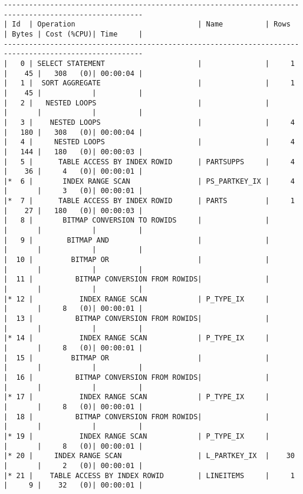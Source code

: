\documentclass[10pt]{article}
\begin{document}
\begin{lstlisting}[style=queryexecutionplan]
-------------------------------------------------------------------------------------------------------
| Id  | Operation                             | Name          | Rows  | Bytes | Cost (%CPU)| Time     |
-------------------------------------------------------------------------------------------------------
|   0 | SELECT STATEMENT                      |               |     1 |    45 |   308   (0)| 00:00:04 |
|   1 |  SORT AGGREGATE                       |               |     1 |    45 |            |          |
|   2 |   NESTED LOOPS                        |               |       |       |            |          |
|   3 |    NESTED LOOPS                       |               |     4 |   180 |   308   (0)| 00:00:04 |
|   4 |     NESTED LOOPS                      |               |     4 |   144 |   180   (0)| 00:00:03 |
|   5 |      TABLE ACCESS BY INDEX ROWID      | PARTSUPPS     |     4 |    36 |     4   (0)| 00:00:01 |
|*  6 |       INDEX RANGE SCAN                | PS_PARTKEY_IX |     4 |       |     3   (0)| 00:00:01 |
|*  7 |      TABLE ACCESS BY INDEX ROWID      | PARTS         |     1 |    27 |   180   (0)| 00:00:03 |
|   8 |       BITMAP CONVERSION TO ROWIDS     |               |       |       |            |          |
|   9 |        BITMAP AND                     |               |       |       |            |          |
|  10 |         BITMAP OR                     |               |       |       |            |          |
|  11 |          BITMAP CONVERSION FROM ROWIDS|               |       |       |            |          |
|* 12 |           INDEX RANGE SCAN            | P_TYPE_IX     |       |       |     8   (0)| 00:00:01 |
|  13 |          BITMAP CONVERSION FROM ROWIDS|               |       |       |            |          |
|* 14 |           INDEX RANGE SCAN            | P_TYPE_IX     |       |       |     8   (0)| 00:00:01 |
|  15 |         BITMAP OR                     |               |       |       |            |          |
|  16 |          BITMAP CONVERSION FROM ROWIDS|               |       |       |            |          |
|* 17 |           INDEX RANGE SCAN            | P_TYPE_IX     |       |       |     8   (0)| 00:00:01 |
|  18 |          BITMAP CONVERSION FROM ROWIDS|               |       |       |            |          |
|* 19 |           INDEX RANGE SCAN            | P_TYPE_IX     |       |       |     8   (0)| 00:00:01 |
|* 20 |     INDEX RANGE SCAN                  | L_PARTKEY_IX  |    30 |       |     2   (0)| 00:00:01 |
|* 21 |    TABLE ACCESS BY INDEX ROWID        | LINEITEMS     |     1 |     9 |    32   (0)| 00:00:01 |

\end{lstlisting}
\end{document}
